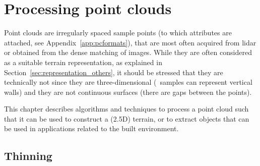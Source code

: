 
\setchapterpreamble[u]{\margintoc}

\graphicspath{{pcprocessing/figs/}}

\chapter{Processing point clouds}%
\label{chap:pcprocessing}

Point clouds are irregularly spaced sample points (to which attributes are attached, see Appendix~\ref{app:pcformats}), that are most often acquired from lidar or obtained from the dense matching of images.
While they are often considered as a suitable terrain representation, as explained in Section~\ref{sec:representation_others}, it should be stressed that they are technically not since they are three-dimensional (\eg\ samples can represent vertical walls) and they are not continuous surfaces (there are gaps between the points).

This chapter describes algorithms and techniques to process a point cloud such that it can be used to construct a (2.5D) terrain, or to extract objects that can be used in applications related to the built environment.



%
\section{Thinning}%
\label{sec:thinning}%

